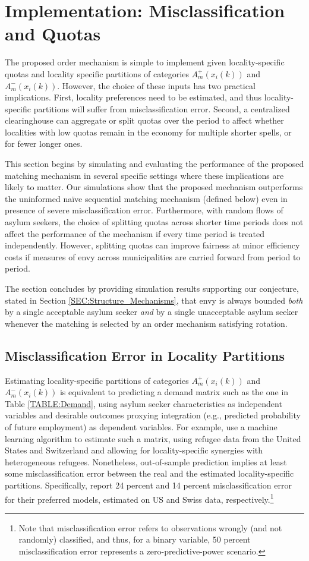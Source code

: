 \documentclass[12pt,fleqn]{article}
\begin{document}
\section{Implementation: Misclassification and Quotas}\label{SEC:simulations}
The proposed order mechanism is simple to implement given locality-specific quotas and locality specific partitions of categories $A^+_m(x_i(k))$ and $A^-_m(x_i(k))$. However, the choice of these inputs has two practical implications. First, locality preferences need to be estimated, and thus locality-specific partitions will suffer from misclassification error. Second, a centralized clearinghouse can aggregate or split quotas over the period to affect whether localities with low quotas remain in the economy for multiple shorter spells, or for fewer longer ones.

This section begins by simulating and evaluating the performance of the proposed matching mechanism in several specific settings where these implications are likely to matter. Our simulations show that the proposed mechanism outperforms the uninformed na\"{i}ve sequential matching mechanism (defined below) even in presence of severe misclassification error. Furthermore, with random flows of asylum seekers, the choice of splitting quotas across shorter time periods does not affect the performance of the mechanism if every time period is treated independently. However, splitting quotas can improve fairness at minor efficiency costs if measures of envy across municipalities are carried forward from period to period.

The section concludes by providing simulation results supporting our conjecture, stated in Section \ref{SEC:Structure_Mechanisms}, that envy is always bounded \emph{both} by a single acceptable asylum seeker \emph{and} by a single unacceptable asylum seeker whenever the matching is selected by an order mechanism satisfying rotation.

\subsection{Misclassification Error in Locality Partitions}
Estimating locality-specific partitions of categories $A^+_m(x_i(k))$ and $A^-_m(x_i(k))$ is equivalent to predicting a demand matrix such as the one in Table \ref{TABLE:Demand}, using asylum seeker characteristics as independent variables and desirable outcomes proxying integration (e.g., predicted probability of future employment) as dependent variables. For example, \cite{bib:BansakEtAl} use a machine learning algorithm to estimate such a matrix, using refugee data from the United States and Switzerland and allowing for locality-specific synergies with heterogeneous refugees. Nonetheless, out-of-sample prediction implies at least some misclassification error between the real and the estimated locality-specific partitions. Specifically, \cite{bib:BansakEtAl} report 24 percent and 14 percent misclassification error for their preferred models, estimated on US and Swiss data, respectively.\footnote{Note that misclassification error refers to observations wrongly (and not randomly) classified, and thus, for a binary variable, 50 percent misclassification error represents a zero-predictive-power scenario.}
\end{document}
